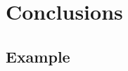\documentclass[12pt]{article}
\begin{document}
\section{Conclusions}
\label{sec:conclusions}




\printbibliography[heading=subbibliography]

\begin{appendices}

\section{Example}
\label{app:example}


\end{appendices}
\end{document}
